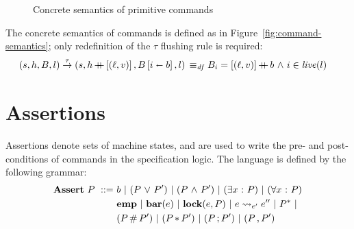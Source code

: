 \documentclass[11pt]{article}
\begin{document}
\begin{figure}[p]
{\begin{minipage}{\columnwidth}
		\vspace{1em}


		\vspace{1em}


		\vspace{1em}



		\vspace{1em}


	\end{minipage}}
	\caption{\label{fig:concrete-primitive-semantics} Concrete semantics of primitive commands}
\end{figure}

The concrete semantics of commands is defined as in Figure~\ref{fig:command-semantics}; only redefinition of the $\tau$ flushing rule is required: \begin{align*} (s,h,B,l) \stackrel{\tau}{\rightarrow} (s,h\operatorname{+\!\!\!+} \left[(\ell,v)\right],B \left[ i \shortleftarrow b \right],l) \operatorname{\;\equiv_{\mathit{df}}\;} & B_i = \left[(\ell,v)\right] \operatorname{+\!\!\!+} b \operatorname{\,\wedge\,} i \in \mathit{live}(l)\end{align*} 

\section{Assertions}
\label{sec:assertions}

Assertions denote sets of machine states, and are used to write the pre- and post-conditions of commands in the specification logic. The language is defined by the following grammar: \begin{align*}
	\mathbf{Assert}~P ~::=~ & b ~|~ (P \operatorname{\,\vee\,} P') ~|~ (P \operatorname{\,\wedge\,} P') ~|~ (\exists x \operatorname{\,:\,} P) ~|~ (\forall x \operatorname{\,:\,} P) \\
	& \mathbf{emp} ~|~ \mathbf{bar}(e) ~|~ \mathbf{lock}(e,P) ~|~ e \leadsto_{e'} e'' ~|~ P^{\ast} ~|~ \\ 
	& (P \operatorname{\#} P') ~|~ (P \operatorname{\ast} P') ~|~ (P \operatorname{;} P') ~|~ (P \operatorname{,} P')
\end{align*} 
\end{document}
